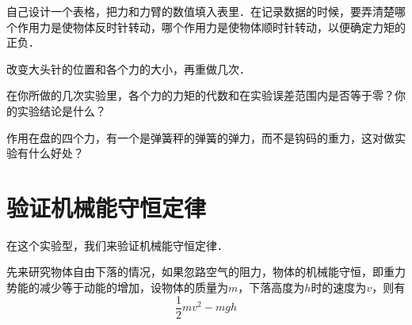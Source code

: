 自己设计一个表格，把力和力臂的数值填入表里．在记录数据的时候，要弄清楚哪个作用力是使物体反时针转动，哪个作用力是使物体顺时针转动，以便确定力矩的正负．

改变大头针的位置和各个力的大小，再重做几次．

在你所做的几次实验里，各个力的力矩的代数和在实验误差范围内是否等于零？你的实验结论是什么？

作用在盘的四个力，有一个是弹簧秤的弹簧的弹力，而不是钩码的重力，这对做实验有什么好处？
\newpage
\section{验证机械能守恒定律}
在这个实验型，我们来验证机械能守恒定律．

先来研究物体自由下落的情况，如果忽路空气的阻力，物体的机械能守恒，即重力势能的减少等于动能的增加，设物体的质量为$m$，下落高度为$h$时的速度为$v$，则有
\[\frac{1}{2}mv^2-mgh\]

